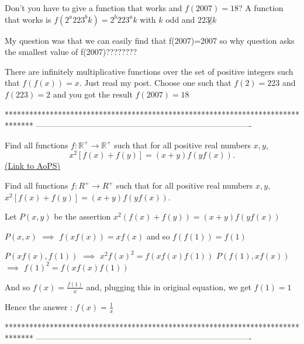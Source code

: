 \begin{solution}
	Don't you have to give a function that works and $f(2007)=18$? A function that works is $f(2^a223^bk)=2^b223^ak$ with $k$ odd and $223\not | k$
\end{solution}



\begin{solution}
	\begin{tcolorbox}My question was that we can easily find that f(2007)=2007 so why question asks the smallest value of f(2007)????????\end{tcolorbox}
There are infinitely multiplicative functions over the set of positive integers such that $f(f(x))=x$.
Just read my post.
Choose one such that $f(2)=223$ and $f(223)=2$ and you got the result $f(2007)=18$



\end{solution}
*******************************************************************************
-------------------------------------------------------------------------------

\begin{problem}
	Find all functions $f:\mathbb R^+ \rightarrow \mathbb R^+$ such that for all positive real numbers $x,y$,
\[x^2[f(x)+f(y)]=(x+y)f(yf(x)).\]
	\flushright \href{https://artofproblemsolving.com/community/c6h467480}{(Link to AoPS)}
\end{problem}



\begin{solution}
	\begin{tcolorbox}Find all functions $f:R^+ \rightarrow R^+$ such that for all positive real numbers $x,y$,
$x^2[f(x)+f(y)]=(x+y)f(yf(x))$.\end{tcolorbox}
Let $P(x,y)$ be the assertion $x^2(f(x)+f(y))=(x+y)f(yf(x))$

$P(x,x)$ $\implies$ $f(xf(x))=xf(x)$ and so $f(f(1))=f(1)$

$P(xf(x),f(1))$ $\implies$ $x^2f(x)^2=f(xf(x)f(1))$
$P(f(1),xf(x))$ $\implies$ $f(1)^2=f(xf(x)f(1))$

And so $f(x)=\frac{f(1)}x$ and, plugging this in original equation, we get $f(1)=1$

Hence the answer : $\boxed{f(x)=\frac 1x}$
\end{solution}
*******************************************************************************
-------------------------------------------------------------------------------

